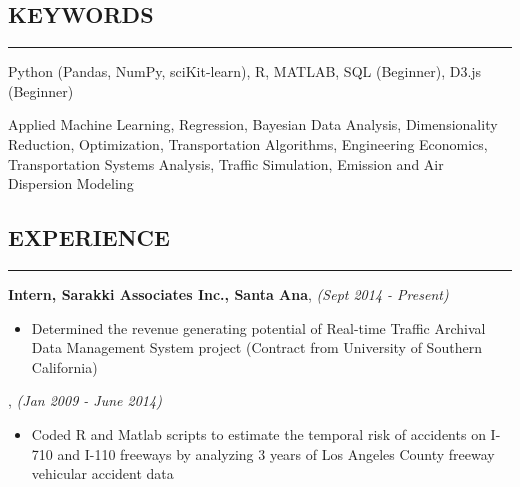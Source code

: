 \documentclass[10pt,a4]{article}
\def\mydot{\textcolor{deep_blue}{\rule{0.75ex}{0.75ex}}}
\begin{document}
\begin{small}
\subsection*{\color{dark_blue}KEYWORDS}
\vspace{-0.15cm}
\hrule
\vspace{0.1cm}
 Python {\color{gray}(Pandas, NumPy, sciKit-learn)}, R, MATLAB, SQL {\color{gray}(Beginner)}, D3.js {\color{gray}(Beginner)} \vspace{-0.25cm}\\


{\noindent Applied Machine Learning, Regression, Bayesian Data Analysis, Dimensionality Reduction, Optimization, Transportation Algorithms, Engineering Economics, Transportation Systems Analysis, Traffic Simulation, Emission and Air Dispersion Modeling

}


\vspace{-0.35cm}
\subsection*{\color{dark_blue}EXPERIENCE}
\vspace{-0.15cm}
\hrule
\vspace{0.1cm}

{\bf Intern, {\color{drkgray}Sarakki Associates Inc., Santa Ana}}, {\em \color{drkgray}(Sept 2014 - Present)}
\begin{itemize}
\item[\mydot] Determined the revenue generating potential of Real-time Traffic Archival Data Management System project (Contract from University of Southern California)
\end{itemize}

, {\em \color{drkgray}(Jan 2009 - June 2014)}

\begin{itemize}
\item[\mydot] Coded R and Matlab scripts to estimate the temporal risk of accidents on I-710 and I-110 freeways by analyzing 3 years of Los Angeles County freeway vehicular accident data


\end{itemize}
\end{small}
\end{document}
